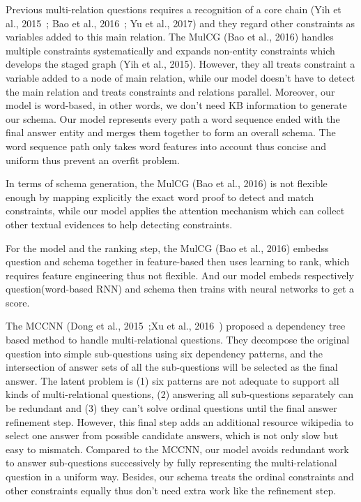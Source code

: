 Previous multi-relation questions requires a recognition of a core chain (Yih et al., 2015~\cite{yih2015semantic}; Bao et al., 2016~\cite{bao2016constraint}; Yu et al., 2017) and  they regard other constraints as variables added to this main relation. The MulCG (Bao et al., 2016) handles multiple constraints systematically and expands non-entity constraints which develops the staged graph (Yih et al., 2015). However, they all treats constraint a variable added to a node of main relation, while our model doesn't have to detect the main relation and treats constraints and relations parallel. Moreover, our model is word-based, in other words, we don't need KB information to generate our schema. Our model represents every path a word sequence ended with the final answer entity and merges them together to form an overall schema. The word sequence path only takes word features into account thus concise and uniform thus prevent an overfit problem.

In terms of schema generation, the MulCG (Bao et al., 2016) is not flexible enough by mapping explicitly the exact word proof to detect and match constraints, while our model applies the attention mechanism which can collect other textual evidences to help detecting constraints.

For the model and the ranking step, the MulCG (Bao et al., 2016) embedss question and schema together in feature-based then uses learning to rank, which requires feature engineering thus not flexible. And our model embeds respectively question(word-based RNN) and schema then trains with neural networks to get a score.

The MCCNN (Dong et al., 2015~\cite{dong2015question};Xu et al., 2016~\cite{xu2016question}) proposed a dependency tree based method to handle multi-relational questions. They decompose the original question into simple sub-questions using six dependency patterns, and the intersection of answer sets of all the sub-questions will be selected as the final answer. The latent problem is (1) six patterns are not adequate to support all kinds of multi-relational questions, (2) answering all sub-questions separately can be redundant and (3) they can't solve ordinal questions until the final answer refinement step. However, this final step adds an additional resource wikipedia to select one answer from possible candidate answers, which is not only slow but easy to mismatch. Compared to the MCCNN, our model avoids redundant work to answer sub-questions successively by fully representing the multi-relational question in a uniform way. Besides, our schema treats the ordinal constraints and other constraints equally thus don't need extra work like the refinement step. 

